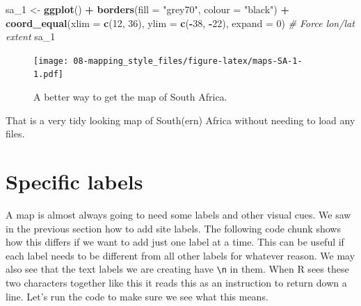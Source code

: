 \documentclass[]{book}
\newenvironment{Shaded}{\begin{snugshade}}{\end{snugshade}}
\newcommand{\KeywordTok}[1]{\textcolor[rgb]{0.13,0.29,0.53}{\textbf{#1}}}
\newcommand{\DataTypeTok}[1]{\textcolor[rgb]{0.13,0.29,0.53}{#1}}
\newcommand{\DecValTok}[1]{\textcolor[rgb]{0.00,0.00,0.81}{#1}}
\newcommand{\StringTok}[1]{\textcolor[rgb]{0.31,0.60,0.02}{#1}}
\newcommand{\CommentTok}[1]{\textcolor[rgb]{0.56,0.35,0.01}{\textit{#1}}}
\newcommand{\OperatorTok}[1]{\textcolor[rgb]{0.81,0.36,0.00}{\textbf{#1}}}
\newcommand{\NormalTok}[1]{#1}
\theoremstyle{definition}
\theoremstyle{definition}
\theoremstyle{definition}
\theoremstyle{remark}
\begin{document}
\begin{Shaded}
\begin{Highlighting}[]
\NormalTok{sa_}\DecValTok{1}\NormalTok{ <-}\StringTok{ }\KeywordTok{ggplot}\NormalTok{() }\OperatorTok{+}
\StringTok{  }\KeywordTok{borders}\NormalTok{(}\DataTypeTok{fill =} \StringTok{"grey70"}\NormalTok{, }\DataTypeTok{colour =} \StringTok{"black"}\NormalTok{) }\OperatorTok{+}
\StringTok{  }\KeywordTok{coord_equal}\NormalTok{(}\DataTypeTok{xlim =} \KeywordTok{c}\NormalTok{(}\DecValTok{12}\NormalTok{, }\DecValTok{36}\NormalTok{), }\DataTypeTok{ylim =} \KeywordTok{c}\NormalTok{(}\OperatorTok{-}\DecValTok{38}\NormalTok{, }\OperatorTok{-}\DecValTok{22}\NormalTok{), }\DataTypeTok{expand =} \DecValTok{0}\NormalTok{) }\CommentTok{# Force lon/lat extent}
\NormalTok{sa_}\DecValTok{1}
\end{Highlighting}
\end{Shaded}

\begin{figure}
\centering
\texttt{[image: 08-mapping\_style\_files/figure-latex/maps-SA-1-1.pdf]}
\caption{\label{fig:maps-SA-1}A better way to get the map of South Africa.}
\end{figure}

That is a very tidy looking map of South(ern) Africa without needing to
load any files.

\section{Specific labels}\label{specific-labels}

A map is almost always going to need some labels and other visual cues.
We saw in the previous section how to add site labels. The following
code chunk shows how this differs if we want to add just one label at a
time. This can be useful if each label needs to be different from all
other labels for whatever reason. We may also see that the text labels
we are creating have \texttt{\textbackslash{}n} in them. When R sees
these two characters together like this it reads this as an instruction
to return down a line. Let's run the code to make sure we see what this
means.
\end{document}
